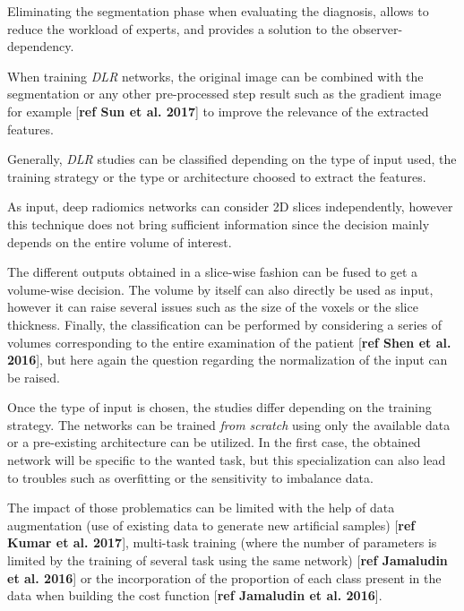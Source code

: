 \documentclass[]{article}
\begin{document}
Eliminating the segmentation phase when evaluating the diagnosis, allows
to reduce the workload of experts, and provides a solution to the
observer-dependency.

When training \emph{DLR} networks, the original image can be combined
with the segmentation or any other pre-processed step result such as the
gradient image for example {[}\textbf{ref Sun et al. 2017}{]} to improve
the relevance of the extracted features.

Generally, \emph{DLR} studies can be classified depending on the type of
input used, the training strategy or the type or architecture choosed to
extract the features.

As input, deep radiomics networks can consider 2D slices independently,
however this technique does not bring sufficient information since the
decision mainly depends on the entire volume of interest.

The different outputs obtained in a slice-wise fashion can be fused to
get a volume-wise decision. The volume by itself can also directly be
used as input, however it can raise several issues such as the size of
the voxels or the slice thickness. Finally, the classification can be
performed by considering a series of volumes corresponding to the entire
examination of the patient {[}\textbf{ref Shen et al. 2016}{]}, but here
again the question regarding the normalization of the input can be
raised.

Once the type of input is chosen, the studies differ depending on the
training strategy. The networks can be trained \emph{from scratch} using
only the available data or a pre-existing architecture can be utilized.
In the first case, the obtained network will be specific to the wanted
task, but this specialization can also lead to troubles such as
overfitting or the sensitivity to imbalance data.

The impact of those problematics can be limited with the help of data
augmentation (use of existing data to generate new artificial samples)
{[}\textbf{ref Kumar et al. 2017}{]}, multi-task training (where the
number of parameters is limited by the training of several task using
the same network) {[}\textbf{ref Jamaludin et al. 2016}{]} or the
incorporation of the proportion of each class present in the data when
building the cost function {[}\textbf{ref Jamaludin et al. 2016}{]}.
\end{document}

